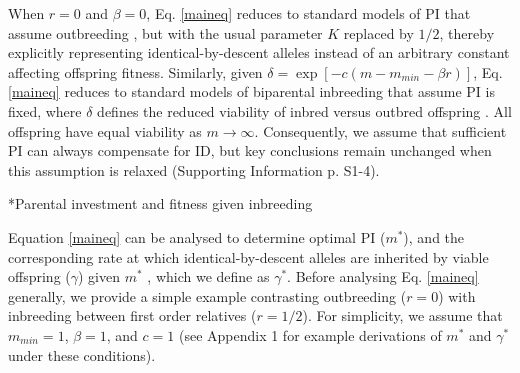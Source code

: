 \documentclass[12pt]{article}
\makeatletter
\renewcommand\subsection{\@startsection{subsection}{1}{-0.25in}{-0.5\baselineskip}{0.1\baselineskip}{\normalfont\normalsize\bfseries\textit}}
\makeatother
\begin{document}
When $r=0$ and $\beta=0$, Eq. \ref{maineq} reduces to standard models of PI that assume outbreeding \cite[e.g.,][]{Macnair1978, Parker1978}, but with the usual parameter $K$ replaced by $1/2$, thereby explicitly representing identical-by-descent alleles instead of an arbitrary constant affecting offspring fitness. Similarly, given $\delta = \exp\left[-c\left(m-m_{min}-\beta r\right)\right]$, Eq. \ref{maineq} reduces to standard models of biparental inbreeding that assume PI is fixed, where $\delta$ defines the reduced viability of inbred versus outbred offspring \cite[see][]{Kokko2006, Parker2006, Duthie2015a}.  All offspring have equal viability as $m \to \infty$. Consequently, we assume that sufficient PI can always compensate for ID, but key conclusions remain unchanged when this assumption is relaxed (Supporting Information p. S1-4).

\subsection*{Parental investment and fitness given inbreeding}

Equation \ref{maineq} can be analysed to determine optimal PI ($m^{*}$), and the corresponding rate at which identical-by-descent alleles are inherited by viable offspring ($\gamma$) given $m^{*}$ \cite[][]{Kuijper2012}, which we define as $\gamma^{*}$. Before analysing Eq. \ref{maineq} generally, we provide a simple example contrasting outbreeding ($r=0$) with inbreeding between first order relatives ($r=1/2$). For simplicity, we assume that $m_{min}=1$, $\beta=1$, and $c=1$ (see Appendix 1 for example derivations of $m^{*}$ and $\gamma^{*}$ under these conditions). 
\end{document}
